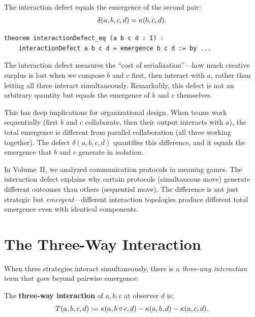 \begin{theorem}
\label{thm:interaction-defect}
The interaction defect equals the emergence of the second pair:
\[
  \delta(a,b,c,d) = \kappa(b, c, d).
\]
\end{theorem}

\begin{lstlisting}[caption={Interaction defect (IDT\_v3\_Emergence.lean)}]
theorem interactionDefect_eq (a b c d : I) :
    interactionDefect a b c d = emergence b c d := by ...
\end{lstlisting}

\begin{interpretation}
The interaction defect measures the ``cost of serialization''---how much
creative surplus is lost when we compose $b$ and $c$ first, then interact with
$a$, rather than letting all three interact simultaneously. Remarkably, this
defect is not an arbitrary quantity but equals the emergence of $b$ and $c$
themselves.

This has deep implications for organizational design. When teams work
sequentially (first $b$ and $c$ collaborate, then their output interacts with
$a$), the total emergence is different from parallel collaboration (all three
working together). The defect $\delta(a,b,c,d)$ quantifies this difference,
and it equals the emergence that $b$ and $c$ generate in isolation.

In Volume~II, we analyzed communication protocols in meaning games. The
interaction defect explains why certain protocols (simultaneous move) generate
different outcomes than others (sequential move). The difference is not just
strategic but \emph{emergent}---different interaction topologies produce
different total emergence even with identical components.
\end{interpretation}

\section{The Three-Way Interaction}

When three strategies interact simultaneously, there is a \emph{three-way
interaction} term that goes beyond pairwise emergence:

\begin{definition}
\label{def:three-way-interaction}
The \textbf{three-way interaction} of $a, b, c$ at observer $d$ is:
\[
  T(a,b,c,d) := \kappa(a, b \circ c, d) - \kappa(a, b, d) - \kappa(a, c, d).
\]
\end{definition}

